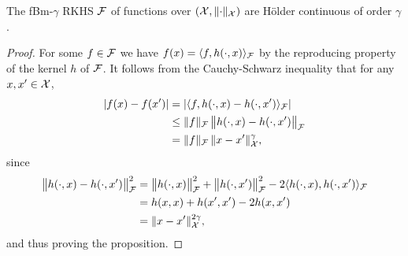 \begin{proposition}
  The fBm-$\gamma$ RKHS ${\mathcal F}$ of functions over $({\mathcal X}, \lVert\cdot\rVert_{\mathcal X})$ are Hölder continuous of order $\gamma$.
\end{proposition}

\begin{proof}
  For some $f \in {\mathcal F}$ we have $f(x) = \langle f,h(\cdot,x)\rangle_{\mathcal F}$ by the reproducing property of the kernel $h$ of ${\mathcal F}$.
  It follows from the Cauchy-Schwarz inequality that for any $x,x'\in{\mathcal X}$,
  \begin{align*}
    \vert f(x) - f(x') \vert 
    &= \vert \langle f,h(\cdot,x) - h(\cdot,x')\rangle_{\mathcal F} \vert \\
    &\leq \lVert f\rVert_{\mathcal F} \, \big\Vert h(\cdot,x) - h(\cdot,x') \big\Vert_{\mathcal F} \\
    &= \lVert f\rVert_{\mathcal F} \, \lVert x-x'\rVert_{\mathcal X}^{\gamma},
  \end{align*}
  since
  \begin{align*}
    \big\Vert h(\cdot,x) - h(\cdot,x') \big\Vert_{\mathcal F} ^2
    &= \big\Vert h(\cdot,x) \big\Vert_{\mathcal F} ^2 + \big\Vert h(\cdot,x') \big\Vert_{\mathcal F} ^2 - 2 \langle h(\cdot,x),h(\cdot,x')\rangle_{\mathcal F} \\
    &= h(x,x) + h(x',x') - 2 h(x,x') \\
    &= \lVert x-x'\rVert_{\mathcal X}^{2\gamma},
  \end{align*}  
  and thus proving the proposition.
\end{proof}
\pagebreak


